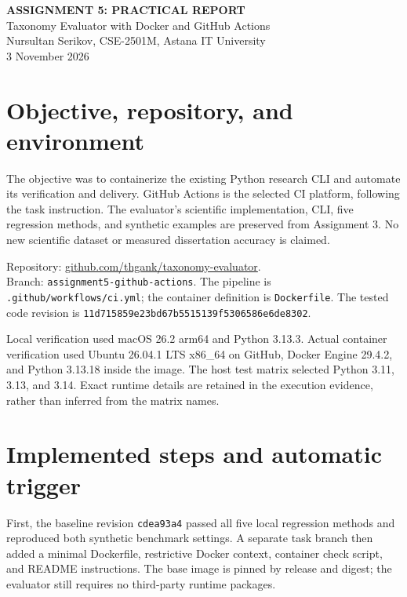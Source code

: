 

\begin{center}
\textbf{ASSIGNMENT 5: PRACTICAL REPORT}\\
Taxonomy Evaluator with Docker and GitHub Actions\\
Nursultan Serikov, CSE-2501M, Astana IT University\\
3 November 2026
\end{center}

\section{Objective, repository, and environment}
The objective was to containerize the existing Python research CLI and automate its verification and delivery. GitHub Actions is the selected CI platform, following the task instruction. The evaluator's scientific implementation, CLI, five regression methods, and synthetic examples are preserved from Assignment 3. No new scientific dataset or measured dissertation accuracy is claimed.

Repository: \href{https://github.com/thgank/taxonomy-evaluator/tree/assignment5-github-actions}{github.com/thgank/taxonomy-evaluator}.\\
Branch: \texttt{assignment5-github-actions}. The pipeline is \texttt{.github/workflows/ci.yml}; the container definition is \texttt{Dockerfile}. The tested code revision is\newline
\texttt{11d715859e23bd67b5515139f5306586e6de8302}.

Local verification used macOS 26.2 arm64 and Python 3.13.3. Actual container verification used Ubuntu 26.04.1 LTS x86\_64 on GitHub, Docker Engine 29.4.2, and Python 3.13.18 inside the image. The host test matrix selected Python 3.11, 3.13, and 3.14. Exact runtime details are retained in the execution evidence, rather than inferred from the matrix names.

\section{Implemented steps and automatic trigger}
First, the baseline revision \texttt{cdea93a4} passed all five local regression methods and reproduced both synthetic benchmark settings. A separate task branch then added a minimal Dockerfile, restrictive Docker context, container check script, and README instructions. The base image is pinned by release and digest; the evaluator still requires no third-party runtime packages.

